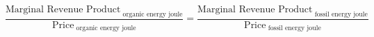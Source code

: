 \documentclass[final]{beamer}
\begin{document}
\begin{frame}
\scriptsize{
		\begin{equation}
		\label{eq:mrp}
		\frac{\text{Marginal Revenue Product}_{\text{ organic energy joule}}}{\text{Price}_{\text{ organic energy joule}}} = \frac{\text{Marginal Revenue Product}_{\text{ fossil energy joule}}}{\text{Price}_{\text{ fossil energy joule}}}
		\end{equation}
}
\end{frame}
\end{document}
